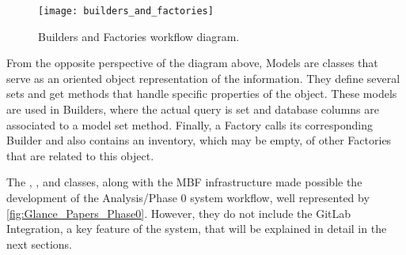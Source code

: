 \begin{figure}[htb]
    \centering
    \texttt{[image: builders\_and\_factories]}
    \caption{Builders and Factories workflow diagram.}%
    \label{fig:builders_and_factories}
\end{figure}

From the opposite perspective of the diagram above, Models are classes that serve as an oriented object representation of the information. They define several sets and get methods that handle specific properties of the object. These models are used in Builders, where the actual query is set and database columns are associated to a model set method. Finally, a Factory calls its corresponding Builder and also contains an inventory, which may be empty, of other Factories that are related to this object.

The , ,  and  classes, along with the MBF infrastructure made possible the development of the Analysis/Phase 0 system workflow, well represented by \cref{fig:Glance_Papers_Phase0}.
However, they do not include the GitLab Integration, a key feature of the system, that will be explained in detail in the next sections.
